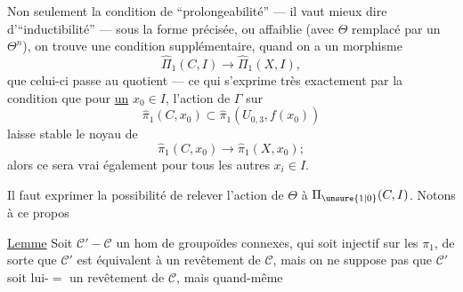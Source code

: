 Non seulement la condition de  ``prolongeabilité'' --- il vaut mieux dire d'``inductibilité'' --- sous la forme précisée, ou affaiblie (avec $\Theta$ remplacé par un $\Theta^n$), on trouve une condition supplémentaire, quand on a  un morphisme
\[
\widehat\Pi_1(C,I)\longrightarrow\widehat\Pi_1(X,I),
\]
que celui-ci passe au quotient --- ce qui s'exprime très exactement par la condition que pour \uline{un} $x_0\in I$, l'action de $\Gamma$ sur
\[
\widehat\pi_1(C,x_0)\subset\widehat\pi_1(U_{0,3},f(x_0))
\]
laisse stable le noyau de
\[
\widehat\pi_1(C,x_0)\longrightarrow\widehat\pi_1(X,x_0);
\]
alors ce sera vrai également pour tous les autres $x_i\in I$.

Il faut exprimer la possibilité de relever l'action de $\Theta$ à $\Pi_{\unsure{1|0}}(C,I)$. Notons à ce propos

\uline{Lemme} Soit $\mathcal C'-\mathcal C$ un hom de groupoïdes connexes, qui soit injectif sur les $\pi_1$,  de sorte que $\mathcal C'$ est équivalent à un revêtement de $\mathcal C$, mais on ne suppose pas que $\mathcal C'$ soit lui-$=$ un revêtement de $\mathcal C$, mais quand-même 
